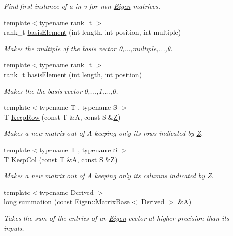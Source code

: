 \begin{DoxyCompactItemize}
\begin{DoxyCompactList}\small\item\em Find first instance of a in v for non \hyperlink{namespaceEigen}{Eigen} matrices. \end{DoxyCompactList}\item 
{\footnotesize template$<$typename rank\+\_\+t $>$ }\\rank\+\_\+t \hyperlink{namespaceMackey_ac2e368bf7d802f2fc47e39a71a5a1630}{basis\+Element} (int length, int position, int multiple)
\begin{DoxyCompactList}\small\item\em Makes the multiple of the basis vector 0,...,multiple,...,0. \end{DoxyCompactList}\item 
{\footnotesize template$<$typename rank\+\_\+t $>$ }\\rank\+\_\+t \hyperlink{namespaceMackey_aa10c6cbea565e024a38b446139800b69}{basis\+Element} (int length, int position)
\begin{DoxyCompactList}\small\item\em Makes the the basis vector 0,...,1,...,0. \end{DoxyCompactList}\item 
{\footnotesize template$<$typename T , typename S $>$ }\\T \hyperlink{namespaceMackey_ad6870101d4fd762100a3115abc4a15db}{Keep\+Row} (const T \&A, const S \&\hyperlink{classZ}{Z})
\begin{DoxyCompactList}\small\item\em Makes a new matrix out of A keeping only its rows indicated by \hyperlink{classZ}{Z}. \end{DoxyCompactList}\item 
{\footnotesize template$<$typename T , typename S $>$ }\\T \hyperlink{namespaceMackey_a9a8496759bc7bb14dcaa2284ae1d0491}{Keep\+Col} (const T \&A, const S \&\hyperlink{classZ}{Z})
\begin{DoxyCompactList}\small\item\em Makes a new matrix out of A keeping only its columns indicated by \hyperlink{classZ}{Z}. \end{DoxyCompactList}\item 
{\footnotesize template$<$typename Derived $>$ }\\long \hyperlink{namespaceMackey_a654ed2652808daa206cdaa7ac0fce0e1}{summation} (const Eigen\+::\+Matrix\+Base$<$ Derived $>$ \&A)
\begin{DoxyCompactList}\small\item\em Takes the sum of the entries of an \hyperlink{namespaceEigen}{Eigen} vector at higher precision than its inputs. \end{DoxyCompactList}\item 

\end{DoxyCompactItemize}
